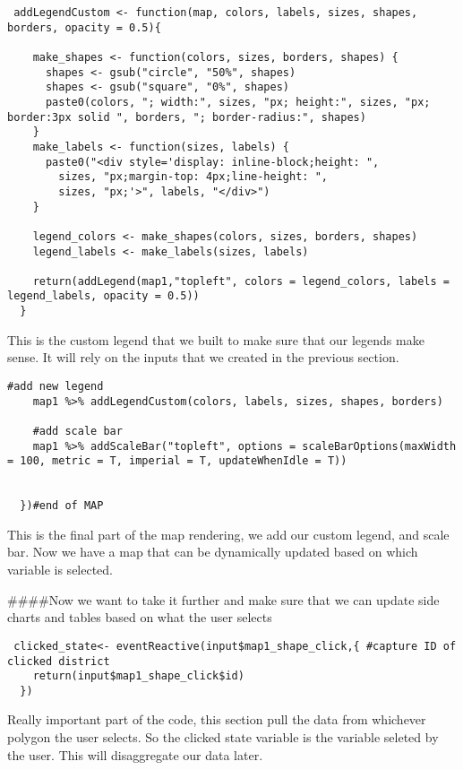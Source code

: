\documentclass[
]{article}
\begin{document}
\begin{verbatim}
 addLegendCustom <- function(map, colors, labels, sizes, shapes, borders, opacity = 0.5){
      
    make_shapes <- function(colors, sizes, borders, shapes) {
      shapes <- gsub("circle", "50%", shapes)
      shapes <- gsub("square", "0%", shapes)
      paste0(colors, "; width:", sizes, "px; height:", sizes, "px; border:3px solid ", borders, "; border-radius:", shapes)
    }
    make_labels <- function(sizes, labels) {
      paste0("<div style='display: inline-block;height: ", 
        sizes, "px;margin-top: 4px;line-height: ", 
        sizes, "px;'>", labels, "</div>")
    }
    
    legend_colors <- make_shapes(colors, sizes, borders, shapes)
    legend_labels <- make_labels(sizes, labels)
    
    return(addLegend(map1,"topleft", colors = legend_colors, labels = legend_labels, opacity = 0.5))
  }
\end{verbatim}

This is the custom legend that we built to make sure that our legends
make sense. It will rely on the inputs that we created in the previous
section.

\begin{verbatim}
#add new legend 
    map1 %>% addLegendCustom(colors, labels, sizes, shapes, borders)
  
    #add scale bar
    map1 %>% addScaleBar("topleft", options = scaleBarOptions(maxWidth = 100, metric = T, imperial = T, updateWhenIdle = T))
    
  
  })#end of MAP
\end{verbatim}

This is the final part of the map rendering, we add our custom legend,
and scale bar. Now we have a map that can be dynamically updated based
on which variable is selected.

\#\#\#\#Now we want to take it further and make sure that we can update
side charts and tables based on what the user selects

\begin{verbatim}
 clicked_state<- eventReactive(input$map1_shape_click,{ #capture ID of clicked district
    return(input$map1_shape_click$id)
  })
\end{verbatim}

Really important part of the code, this section pull the data from
whichever polygon the user selects. So the clicked state variable is the
variable seleted by the user. This will disaggregate our data later.
\end{document}
